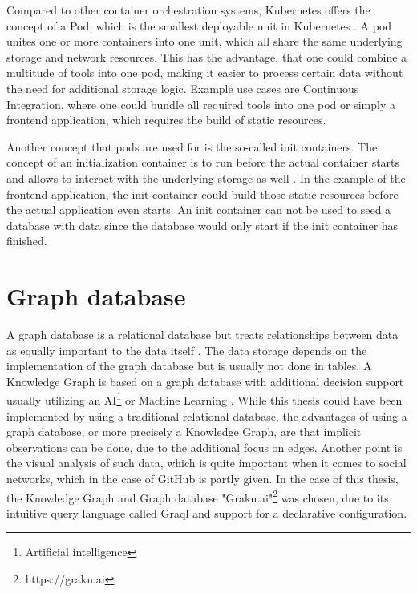Compared to other container orchestration systems, Kubernetes offers the concept of a Pod, which is the smallest deployable unit in Kubernetes \cite{pods}. A pod unites one or more containers into one unit, which all share the same underlying storage and network resources. This has the advantage, that one could combine a multitude of tools into one pod, making it easier to process certain data without the need for additional storage logic. Example use cases are Continuous Integration, where one could bundle all required tools into one pod or simply a frontend application, which requires the build of static resources.

Another concept that pods are used for is the so-called init containers. The concept of an initialization container is to run before the actual container starts and allows to interact with the underlying storage as well \cite{init}. In the example of the frontend application, the init container could build those static resources before the actual application even starts. An init container can not be used to seed a database with data since the database would only start if the init container has finished.

\section{Graph database}
A graph database is a relational database but treats relationships between data as equally important to the data itself \cite{graphdb}. The data storage depends on the implementation of the graph database but is usually not done in tables.
A Knowledge Graph is based on a graph database with additional decision support usually utilizing an AI\footnote{Artificial intelligence} or Machine Learning \cite{knowledgegraph}. While this thesis could have been implemented by using a traditional relational database, the advantages of using a graph database, or more precisely a Knowledge Graph, are that implicit observations can be done, due to the additional focus on edges. Another point is the visual analysis of such data, which is quite important when it comes to social networks, which in the case of GitHub is partly given.
In the case of this thesis, the Knowledge Graph and Graph database "Grakn.ai"\footnote{https://grakn.ai} was chosen, due to its intuitive query language called Graql and support for a declarative configuration.

